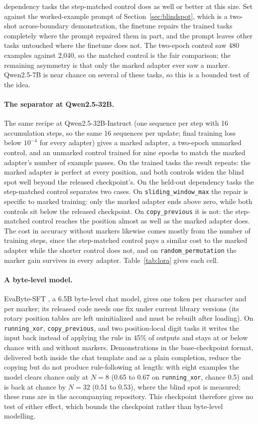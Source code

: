 \documentclass[10pt]{article} %
\newcommand{\task}[1]{\texttt{#1}}
\begin{document}
dependency tasks the step-matched control does as well or better at this size. Set against the worked-example prompt of Section~\ref{sec:blindspot}, which is a two-shot across-boundary demonstration, the finetune repairs the trained tasks completely where the prompt repaired them in part, and the prompt leaves other tasks untouched where the finetune does not. The two-epoch control saw 480 examples against 2{,}040, so the matched control is the fair comparison; the remaining asymmetry is that only the marked adapter ever saw a marker. Qwen2.5-7B is near chance on several of these tasks, so this is a bounded test of the idea.

\paragraph{The separator at Qwen2.5-32B.} The same recipe at Qwen2.5-32B-Instruct (one sequence per step with 16 accumulation steps, so the same 16 sequences per update; final training loss below $10^{-4}$ for every adapter) gives a marked adapter, a two-epoch unmarked control, and an unmarked control trained for nine epochs to match the marked adapter's number of example passes. On the trained tasks the result repeats: the marked adapter is perfect at every position, and both controls widen the blind spot well beyond the released checkpoint's. On the held-out dependency tasks the step-matched control separates two cases. On \task{sliding\_window\_max} the repair is specific to marked training: only the marked adapter ends above zero, while both controls sit below the released checkpoint. On \task{copy\_previous} it is not: the step-matched control reaches the position almost as well as the marked adapter does. The cost in accuracy without markers likewise comes mostly from the number of training steps, since the step-matched control pays a similar cost to the marked adapter while the shorter control does not, and on \task{random\_permutation} the marker gain survives in every adapter. Table~\ref{tab:lora} gives each cell.

\paragraph{A byte-level model.} EvaByte-SFT \citep{zheng2025evabyte}, a 6.5B byte-level chat model, gives one token per character and per marker; its released code needs one fix under current library versions (its rotary position tables are left uninitialized and must be rebuilt after loading). On \task{running\_xor}, \task{copy\_previous}, and two position-local digit tasks it writes the input back instead of applying the rule in 45\% of outputs and stays at or below chance with and without markers. Demonstrations in the base-checkpoint format, delivered both inside the chat template and as a plain completion, reduce the copying but do not produce rule-following at length: with eight examples the model clears chance only at $N = 8$ (0.65 to 0.67 on \task{running\_xor}, chance 0.5) and is back at chance by $N = 32$ (0.51 to 0.53), where the blind spot is measured; these runs are in the accompanying repository. This checkpoint therefore gives no test of either effect, which bounds the checkpoint rather than byte-level modelling.
\end{document}
